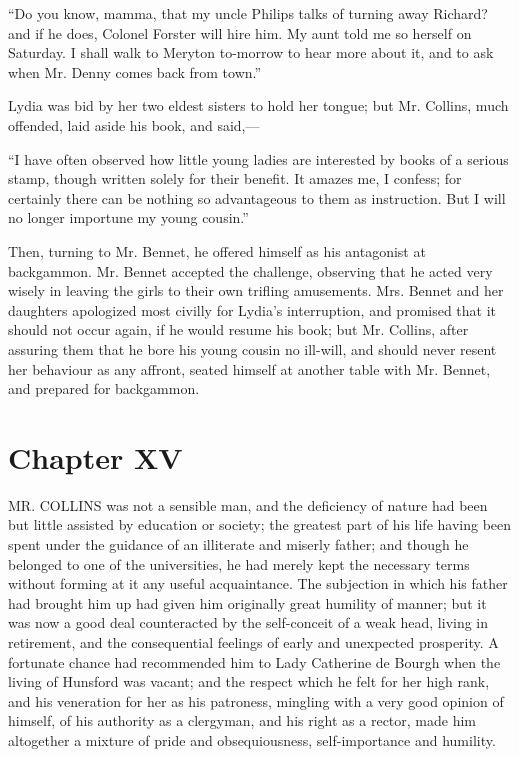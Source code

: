 \documentclass[12pt,openright]{book}
\begin{document}
“Do you know, mamma, that my uncle Philips talks of turning away Richard? and if he does, Colonel Forster will hire him. My aunt told me so herself on Saturday. I shall walk to Meryton to-morrow to hear more about it, and to ask when Mr. Denny comes back from town.”

Lydia was bid by her two eldest sisters to hold her tongue; but Mr. Collins, much offended, laid aside his book, and said,—

“I have often observed how little young ladies are interested by books of a serious stamp, though written solely for their benefit. It amazes me, I confess; for certainly there can be nothing so advantageous to them as instruction. But I will no longer importune my young cousin.”

Then, turning to Mr. Bennet, he offered himself as his antagonist at backgammon. Mr. Bennet accepted the challenge, observing that he acted very wisely in leaving the girls to their own trifling amusements. Mrs. Bennet and her daughters apologized most civilly for Lydia’s interruption, and promised that it should not occur again, if he would resume his book; but Mr. Collins, after assuring them that he bore his young cousin no ill-will, and should never resent her behaviour as any affront, seated himself at another table with Mr. Bennet, and prepared for backgammon.

\chapter{Chapter XV}

\noindent  MR. COLLINS was not a sensible man, and the deficiency of nature had been but little assisted by education or society; the greatest part of his life having been spent under the guidance of an illiterate and miserly father; and though he belonged to one of the universities, he had merely kept the necessary terms without forming at it any useful acquaintance. The subjection in which his father had brought him up had given him originally great humility of manner; but it was now a good deal counteracted by the self-conceit of a weak head, living in retirement, and the consequential feelings of early and unexpected prosperity. A fortunate chance had recommended him to Lady Catherine de Bourgh when the living of Hunsford was vacant; and the respect which he felt for her high rank, and his veneration for her as his patroness, mingling with a very good opinion of himself, of his authority as a clergyman, and his right as a rector, made him altogether a mixture of pride and obsequiousness, self-importance and humility.
\end{document}
